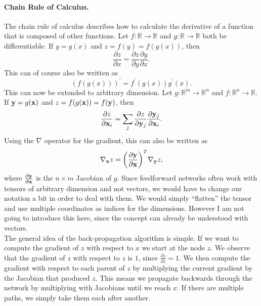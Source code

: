 \paragraph{Chain Rule of Calculus.}
The chain rule of calculus describes how to calculate the derivative of a function that is composed of other functions.
Let \(f: \mathbb{R} \rightarrow \mathbb{R}\) and \(g: \mathbb{R} \rightarrow \mathbb{R}\) both be differentiable.
If \(y = g(x)\) and \(z = f(y) = f(g(x))\), then
\begin{equation}
    \frac{\partial z}{\partial x} = \frac{\partial z}{\partial y} \frac{\partial y}{\partial x}.
\end{equation}
This can of course also be written as
\begin{equation}
    (f(g(x)))^\prime = f^\prime (g(x)) g^\prime(x).
\end{equation}
This can now be extended to arbitrary dimension.
Let \(g: \mathbb{R}^m \rightarrow \mathbb{R}^n\) and \(f: \mathbb{R}^n \rightarrow \mathbb{R}\).
If \(\mathbf{y} = g(\mathbf{x})\) and \(z = f(g(\mathbf{x})) = f(\mathbf{y})\), then
\begin{equation}
    \frac{\partial z}{\partial \mathbf{x}_{i}} = \sum_{j} \frac{\partial z}{\partial \mathbf{y}_{j}} \frac{\partial \mathbf{y}_{j}}{\partial \mathbf{x}_{i}}.
\end{equation}
Using the \(\nabla\) operator for the gradient, this can also be written as
\begin{equation}
    \label{eq:jacobian-vector-product}
    \nabla_{\mathbf{x}} z = \bigg( \frac{\partial \mathbf{y}}{\partial \mathbf{x}} \bigg)^{T} \nabla_{\mathbf{y}} z,
\end{equation}
where \(\frac{\partial \mathbf{y}}{\partial \mathbf{x}}\) is the \(n \times m\) Jacobian of \(g\).
Since feedforward networks often work with tensors of arbitrary dimension and not vectors, we would have to change our notation a bit in order to deal with them.
We would simply \enquote{flatten} the tensor and use multiple coordinates as indices for the dimensions.
However I am not going to introduce this here, since the concept can already be understood with vectors. \\

The general idea of the back-propagation algorithm is simple.
If we want to compute the gradient of \(z\) with respect to \(x\) we start at the node \(z\).
We observe that the gradient of \(z\) with respect to \(z\) is \(1\), since \(\frac{\partial z}{\partial z} = 1\).
We then compute the gradient with respect to each parent of \(z\) by multiplying the current gradient by the Jacobian that produced \(z\).
This means we propagate backwards through the network by multiplying with Jacobians until we reach \(x\).
If there are multiple paths, we simply take them each after another.

